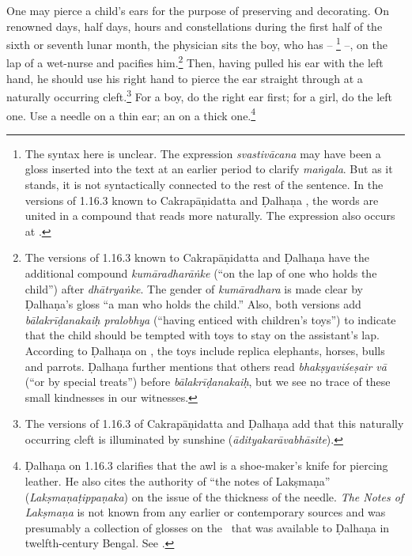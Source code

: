 \begin{translation}
\item [2] One may pierce a child's ears for the purpose of preserving and
decorating. On renowned days, half days, hours and constellations during the first
half of the sixth or seventh lunar month, the physician sits the boy, who has
 -- \footnote{The syntax here is unclear. The expression
\emph{svastivācana} may have been a gloss inserted into the text at an earlier
period to clarify \emph{maṅgala}.  But as it stands, it is not syntactically
connected to the rest of the sentence. In the versions of 1.16.3 known to
Cakrapāṇidatta \citep[126]{acar-1939} and Ḍalhaṇa \citep[76]{vulgate}, the words
are united in a compound that reads more naturally.  The expression also occurs at
.} --, on the lap of a wet-nurse and pacifies him.\footnote{The
versions of 1.16.3 known to Cakrapāṇidatta \citep[126]{acar-1939} and Ḍalhaṇa
\citep[76]{vulgate} have the additional compound \emph{kumāradharāṅke} (“on the
lap of one who holds the child”) after \emph{dhātryaṅke}. The gender of
\emph{kumāradhara} is made clear by  Ḍalhaṇa's gloss “a man who holds the child.”
Also, both versions add \emph{bālakrīḍanakaiḥ pralobhya} (“having enticed with
children's toys”) to indicate that the child should be tempted with toys to stay
on the assistant's lap. According to Ḍalhaṇa on , the toys include
replica elephants, horses, bulls and parrots. Ḍalhaṇa further mentions that others
read \emph{bhakṣyaviśeṣair vā} (“or by special treats”) before
\emph{bālakrīḍanakaiḥ}, but we see no trace of these small kindnesses in our
witnesses.} Then, having pulled his ear with the left hand, he should use his
right hand to pierce the ear straight through at a naturally occurring
cleft.\footnote{The versions of 1.16.3 of Cakrapāṇidatta \citep[126]{acar-1939}
and Ḍalhaṇa \citep[76]{vulgate} add that this naturally occurring cleft is
illuminated by sunshine  (\emph{ādityakarāvabhāsite}).} For a boy, do the right
ear first; for a girl, do the left one. Use a needle on a thin ear; an
 on a thick one.\footnote{Ḍalhaṇa on 1.16.3 \citep[76]{vulgate}
clarifies that the awl is a shoe-maker's knife for piercing leather.    He also
cites the authority of “the notes of Lakṣmaṇa” (\emph{Lakṣmaṇaṭippaṇaka}) on the
issue of the thickness of the needle. \textit{The Notes of Lakṣmaṇa} is not known
from any earlier or contemporary sources and was presumably a collection of
glosses on the \SS\ that was available to Ḍalhaṇa in twelfth-century Bengal. See
\citet[IA, 386]{meul-hist}.}
    

\end{translation}
